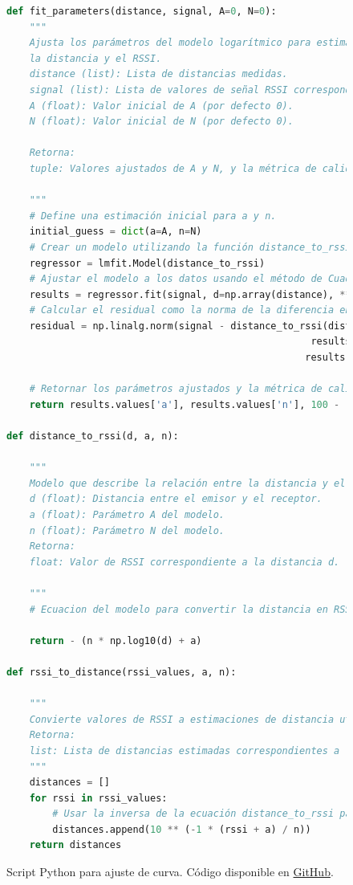 \lstset{style=codestyle}
\begin{figure}[!htb]
\centering
\begin{lstlisting}[language=Python]
def fit_parameters(distance, signal, A=0, N=0):
    """
    Ajusta los parámetros del modelo logarítmico para estimar la relación entre
    la distancia y el RSSI.
    distance (list): Lista de distancias medidas.
    signal (list): Lista de valores de señal RSSI correspondientes a las distancias.
    A (float): Valor inicial de A (por defecto 0).
    N (float): Valor inicial de N (por defecto 0).
    
    Retorna:
    tuple: Valores ajustados de A y N, y la métrica de calidad del ajuste.

    """
    # Define una estimación inicial para a y n.
    initial_guess = dict(a=A, n=N)
    # Crear un modelo utilizando la función distance_to_rssi
    regressor = lmfit.Model(distance_to_rssi)
    # Ajustar el modelo a los datos usando el método de Cuadrados Mínimos Secuenciales (SLSQP)
    results = regressor.fit(signal, d=np.array(distance), **initial_guess, method="slsqp")
    # Calcular el residual como la norma de la diferencia entre la señal observada y la predicha.
    residual = np.linalg.norm(signal - distance_to_rssi(distance,
                                                     results.values['a'],
                                                    results.values['n']))

    # Retornar los parámetros ajustados y la métrica de calidad del ajuste (100 - residual)
    return results.values['a'], results.values['n'], 100 - residual

def distance_to_rssi(d, a, n):

    """
    Modelo que describe la relación entre la distancia y el RSSI.
    d (float): Distancia entre el emisor y el receptor.
    a (float): Parámetro A del modelo.
    n (float): Parámetro N del modelo.
    Retorna:
    float: Valor de RSSI correspondiente a la distancia d.

    """
    # Ecuacion del modelo para convertir la distancia en RSSI

    return - (n * np.log10(d) + a)

def rssi_to_distance(rssi_values, a, n):

    """
    Convierte valores de RSSI a estimaciones de distancia utilizando el modelo ajustado.
    Retorna:
    list: Lista de distancias estimadas correspondientes a los valores de RSSI.
    """
    distances = []
    for rssi in rssi_values:
        # Usar la inversa de la ecuación distance_to_rssi para encontrar la distancia
        distances.append(10 ** (-1 * (rssi + a) / n))
    return distances

\end{lstlisting}
\caption{Script Python para ajuste de curva. Código disponible en 
\label{fig:log-fit-script}
\href{https://github.com/agusalex/rssi-filter-profiling/blob/wip/profiler.py}{GitHub}.  }
\end{figure}

